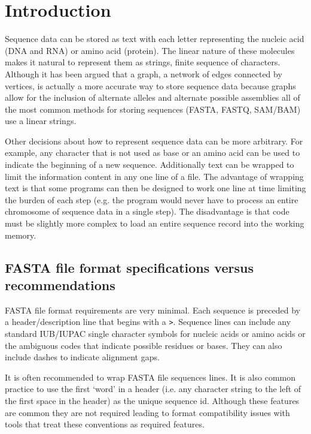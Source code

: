 \section{Introduction}

Sequence data can be stored as text with each letter representing the nucleic acid (DNA and RNA) or amino acid (protein). The linear nature of these molecules makes it natural to represent them as strings, finite sequence of characters. Although it has been argued that a graph, a network of edges connected by vertices, is actually a more accurate way to store sequence data because graphs allow for the inclusion of alternate alleles and alternate possible assemblies \cite{jaffe2012fastg} all of the most common methods for storing sequences (FASTA, FASTQ, SAM/BAM) use a linear strings.

Other decisions about how to represent sequence data can be more arbitrary. For example, any character that is not used as base or an amino acid can be used to indicate the beginning of a new sequence. Additionally text can be wrapped to limit the information content in any one line of a file. The advantage of wrapping text is that some programs can then be designed to work one line at time limiting the burden of each step (e.g. the program would never have to process an entire chromosome of sequence data in a single step). The disadvantage is that code must be slightly more complex to load an entire sequence record into the working memory.

\subsection{FASTA file format specifications versus recommendations}

FASTA file format requirements are very minimal. Each sequence is preceded by a header/description line that begins with a \verb|>|. Sequence lines can include any standard IUB/IUPAC single character symbols for nucleic acids or amino acids or the ambiguous codes that indicate possible residues or bases. They can also include dashes to indicate alignment gaps. 

It is often recommended to wrap FASTA file sequences lines. It is also common practice to use the first `word' in a header (i.e. any character string to the left of the first space in the header) as the unique sequence id. Although these features are common they are not required leading to format compatibility issues with tools that treat these conventions as required features.

